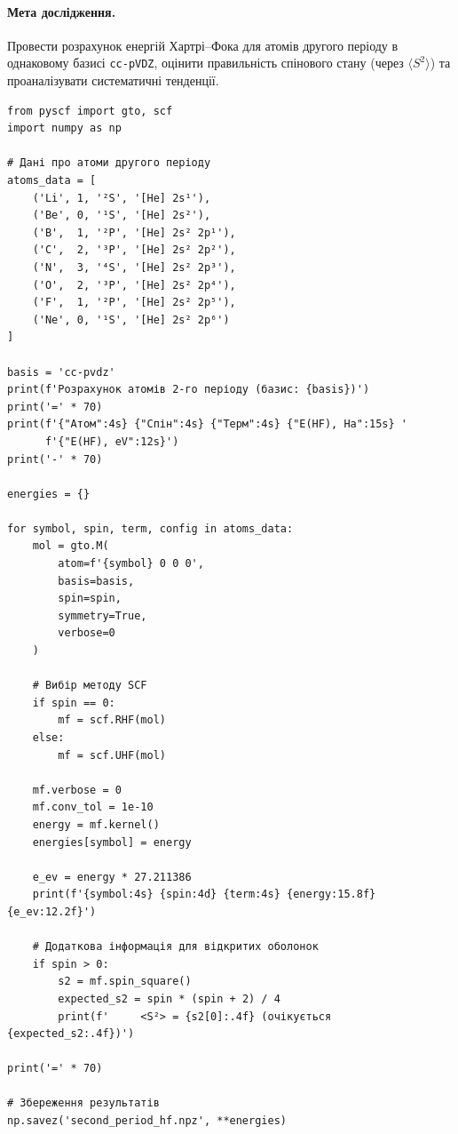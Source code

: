 \paragraph{Мета дослідження.}
Провести розрахунок енергій Хартрі–Фока для атомів другого періоду в однаковому базисі \texttt{cc-pVDZ}, оцінити правильність спінового стану (через \(\langle S^2 \rangle\)) та проаналізувати систематичні тенденції.

\begin{verbatim}
from pyscf import gto, scf
import numpy as np

# Дані про атоми другого періоду
atoms_data = [
    ('Li', 1, '²S', '[He] 2s¹'),
    ('Be', 0, '¹S', '[He] 2s²'),
    ('B',  1, '²P', '[He] 2s² 2p¹'),
    ('C',  2, '³P', '[He] 2s² 2p²'),
    ('N',  3, '⁴S', '[He] 2s² 2p³'),
    ('O',  2, '³P', '[He] 2s² 2p⁴'),
    ('F',  1, '²P', '[He] 2s² 2p⁵'),
    ('Ne', 0, '¹S', '[He] 2s² 2p⁶')
]

basis = 'cc-pvdz'
print(f'Розрахунок атомів 2-го періоду (базис: {basis})')
print('=' * 70)
print(f'{"Атом":4s} {"Спін":4s} {"Терм":4s} {"E(HF), Ha":15s} '
      f'{"E(HF), eV":12s}')
print('-' * 70)

energies = {}

for symbol, spin, term, config in atoms_data:
    mol = gto.M(
        atom=f'{symbol} 0 0 0',
        basis=basis,
        spin=spin,
        symmetry=True,
        verbose=0
    )

    # Вибір методу SCF
    if spin == 0:
        mf = scf.RHF(mol)
    else:
        mf = scf.UHF(mol)

    mf.verbose = 0
    mf.conv_tol = 1e-10
    energy = mf.kernel()
    energies[symbol] = energy

    e_ev = energy * 27.211386
    print(f'{symbol:4s} {spin:4d} {term:4s} {energy:15.8f} {e_ev:12.2f}')

    # Додаткова інформація для відкритих оболонок
    if spin > 0:
        s2 = mf.spin_square()
        expected_s2 = spin * (spin + 2) / 4
        print(f'     <S²> = {s2[0]:.4f} (очікується {expected_s2:.4f})')

print('=' * 70)

# Збереження результатів
np.savez('second_period_hf.npz', **energies)
\end{verbatim}

